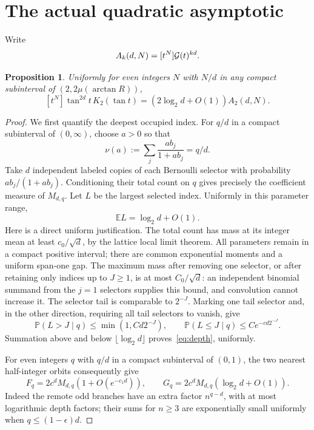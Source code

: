 \documentclass[11pt,a4paper]{article}
\newtheorem{proposition}[theorem]{Proposition}
\theoremstyle{remark}\newtheorem*{ednote}{Editorial note (ProveIt, 2026-10-01)}
\begin{document}
\section{The actual quadratic asymptotic}
Write
\[
 A_k(d,N)=[t^N]\mathcal G(t)^{kd}.
\]
\begin{proposition}\label{prop:quadratic}
Uniformly for even integers $N$ with $N/d$ in any compact subinterval of
$(2,2\mu(\arctan R))$,
\begin{equation}\label{eq:K2asymp}
 [t^N]\tan^{2d}t\,K_2(\tan t)
 =(2\log_2d+O(1))A_2(d,N).
\end{equation}
\end{proposition}
\begin{proof}
We first quantify the deepest occupied index. For $q/d$ in a compact subinterval of $(0,\infty)$, choose $a>0$ so that
\[
 \nu(a):=\sum_j\frac{ab_j}{1+ab_j}=q/d.
\]
Take $d$ independent labeled copies of each Bernoulli selector with probability $ab_j/(1+ab_j)$. Conditioning their total count on $q$ gives precisely the coefficient measure of $M_{d,q}$. Let $L$ be the largest selected index. Uniformly in this parameter range,
\begin{equation}\label{eq:depth}
 \mathbb E L=\log_2d+O(1).
\end{equation}
Here is a direct uniform justification. The total count has mass at its integer mean at least $c_0/\sqrt d$, by the lattice local limit theorem. All parameters remain in a compact positive interval; there are common exponential moments and a uniform span-one gap. The maximum mass after removing one selector, or after retaining only indices up to $J\ge1$, is at most $C_0/\sqrt d$: an independent binomial summand from the $j=1$ selectors supplies this bound, and convolution cannot increase it. The selector tail is comparable to $2^{-J}$. Marking one tail selector and, in the other direction, requiring all tail selectors to vanish, give
\[
 \mathbb P(L>J\mid q)\le\min(1,Cd2^{-J}),\qquad
 \mathbb P(L\le J\mid q)\le C e^{-cd2^{-J}}.
\]
Summation above and below $\lfloor\log_2d\rfloor$ proves~\eqref{eq:depth}, uniformly.

For even integers $q$ with $q/d$ in a compact subinterval of $(0,1)$, the two nearest half-integer orbits consequently give
\begin{equation}\label{eq:lowasymp}
 F_q=2c^dM_{d,q}(1+O(e^{-c_1d})),\qquad
 G_q=2c^dM_{d,q}(\log_2d+O(1)).
\end{equation}
Indeed the remote odd branches have an extra factor $n^{q-d}$, with at most logarithmic depth factors; their sums for $n\ge3$ are exponentially small uniformly when $q\le(1-\epsilon)d$.


\end{proof}
\end{document}
